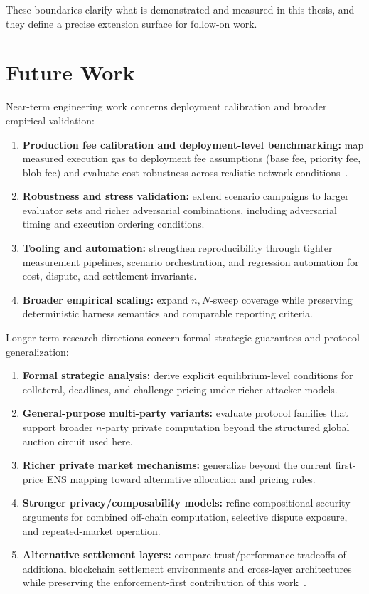 \documentclass[final,twoside]{vutinfth}
\begin{document}
These boundaries clarify what is demonstrated and measured in this thesis, and
they define a precise extension surface for follow-on work.

\section{Future Work}
Near-term engineering work concerns deployment calibration and broader empirical
validation:
\begin{enumerate}
\item \textbf{Production fee calibration and deployment-level benchmarking:} map measured execution gas to deployment fee assumptions (base fee, priority fee, blob fee) and evaluate cost robustness across realistic network conditions~\cite{Buterin2022EIP4844}.
\item \textbf{Robustness and stress validation:} extend scenario campaigns to
larger evaluator sets and richer adversarial combinations, including
adversarial timing and execution ordering conditions.
\item \textbf{Tooling and automation:} strengthen reproducibility through tighter
measurement pipelines, scenario orchestration, and regression automation for
cost, dispute, and settlement invariants.
\item \textbf{Broader empirical scaling:} expand \(n,N\)-sweep coverage while
preserving deterministic harness semantics and comparable reporting criteria.
\end{enumerate}

Longer-term research directions concern formal strategic guarantees and protocol
generalization:
\begin{enumerate}
\item \textbf{Formal strategic analysis:} derive explicit equilibrium-level
conditions for collateral, deadlines, and challenge pricing under richer
attacker models.
\item \textbf{General-purpose multi-party variants:} evaluate protocol families
that support broader \(n\)-party private computation beyond the structured
global auction circuit used here.
\item \textbf{Richer private market mechanisms:} generalize beyond the current
first-price ENS mapping toward alternative allocation and pricing rules.
\item \textbf{Stronger privacy/composability models:} refine compositional
security arguments for combined off-chain computation, selective dispute
exposure, and repeated-market operation.
\item \textbf{Alternative settlement layers:} compare trust/performance tradeoffs
of additional blockchain settlement environments and cross-layer architectures
while preserving the enforcement-first contribution of this work~\cite{Haloani2024COTIv2}.
\end{enumerate}
\end{document}
